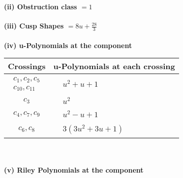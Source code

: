 \documentclass[1p]{elsarticle_modified}
\theoremstyle{definition}
\begin{document}
\flushleft \textbf{(ii) Obstruction class $= 1$}\\~\\
\flushleft \textbf{(iii) Cusp Shapes $= 8 u+\frac{28}{3}$}\\~\\
\newpage\renewcommand{\arraystretch}{1}
\flushleft \textbf{(iv) u-Polynomials at the component}\newline \\
\begin{tabular}{m{50pt}|m{274pt}}
Crossings & \hspace{64pt}u-Polynomials at each crossing \\
\hline $$\begin{aligned}c_{1},c_{2},c_{5}\\c_{10},c_{11}\end{aligned}$$&$\begin{aligned}
&u^2+u+1
\end{aligned}$\\
\hline $$\begin{aligned}c_{3}\end{aligned}$$&$\begin{aligned}
&u^2
\end{aligned}$\\
\hline $$\begin{aligned}c_{4},c_{7},c_{9}\end{aligned}$$&$\begin{aligned}
&u^2- u+1
\end{aligned}$\\
\hline $$\begin{aligned}c_{6},c_{8}\end{aligned}$$&$\begin{aligned}
&3(3 u^2+3 u+1)
\end{aligned}$\\
\hline
\end{tabular}\\~\\
\newpage\renewcommand{\arraystretch}{1}
\flushleft \textbf{(v) Riley Polynomials at the component}\newline \\
\end{document}
